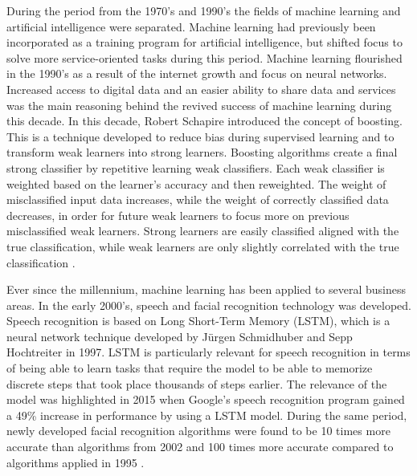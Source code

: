\indent\newline
During the period from the 1970's and 1990's the fields of machine learning and artificial intelligence were separated. Machine learning had previously been incorporated as a training program for artificial intelligence, but shifted focus to solve more service-oriented tasks during this period. Machine learning flourished in the 1990's as a result of the internet growth and focus on neural networks. Increased access to digital data and an easier ability to share data and services was the main reasoning behind the revived success of machine learning during this decade. In this decade, Robert Schapire introduced the concept of boosting. This is a technique developed to reduce bias during supervised learning and to transform weak learners into strong learners. Boosting algorithms create a final strong classifier by repetitive learning weak classifiers. Each weak classifier is weighted based on the learner’s accuracy and then reweighted. The weight of misclassified input data increases, while the weight of correctly classified data decreases, in order for future weak learners to focus more on previous misclassified weak learners. Strong learners are easily classified aligned with the true classification, while weak learners are only slightly correlated with the true classification \cite{dataversity}. 

\indent\newline
Ever since the millennium, machine learning has been applied to several business areas. In the early 2000's, speech and facial recognition technology was developed. Speech recognition is based on Long Short-Term Memory (LSTM), which is a neural network technique developed by Jürgen Schmidhuber and Sepp Hochtreiter in 1997. LSTM is particularly relevant for speech recognition in terms of being able to learn tasks that require the model to be able to memorize discrete steps that took place thousands of steps earlier. The relevance of the model was highlighted in 2015 when Google's speech recognition program gained a 49\% increase in performance by using a LSTM model. During the same period, newly developed facial recognition algorithms were found to be 10 times more accurate than algorithms from 2002 and 100 times more accurate compared to algorithms applied in 1995 \cite{dataversity}.    

